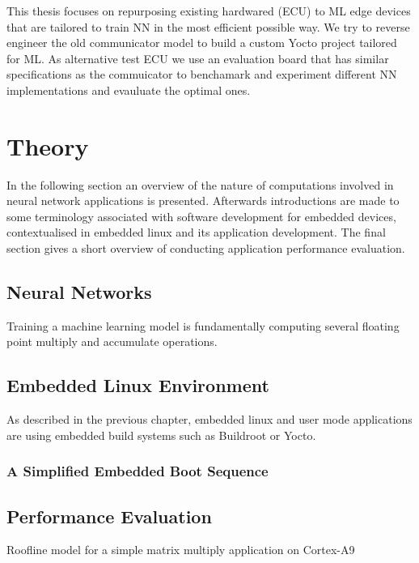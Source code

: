 This thesis focuses on repurposing existing hardwared (ECU) to ML edge devices that are tailored to train NN in the most efficient possible way. We try to reverse engineer the old communicator model to build a custom Yocto project tailored for ML. As alternative test ECU we use an evaluation board that has similar specifications as the commuicator to benchamark and experiment different NN implementations and evauluate the optimal ones.

\chapter{Theory}

In the following section an overview of the nature of computations involved in neural network applications is presented. Afterwards introductions are made to some terminology associated with software development for embedded devices, contextualised in embedded linux and its application development. The final section gives a short overview of conducting application performance evaluation.

\section{Neural Networks}

Training a machine learning model is fundamentally computing several floating point multiply and accumulate operations.

\section{Embedded Linux Environment}

As described in the previous chapter, embedded linux and user mode applications are using embedded build systems such as Buildroot or Yocto.

\subsection{A Simplified Embedded Boot Sequence}

\section{Performance Evaluation}

Roofline model for a simple matrix multiply application on Cortex-A9
